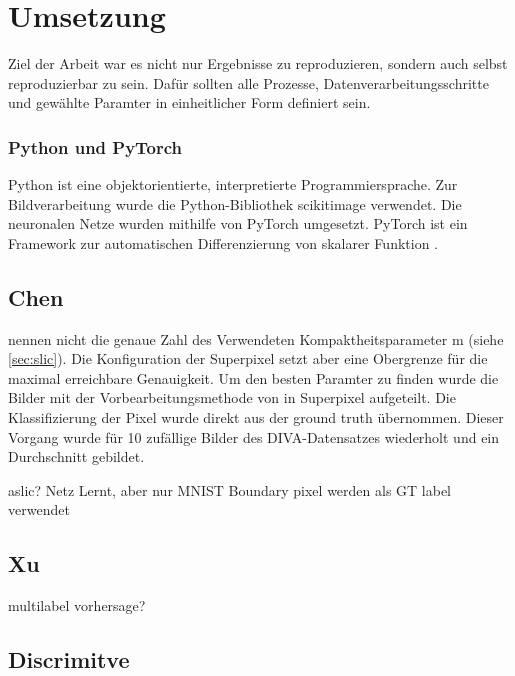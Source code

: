\chapter{Umsetzung}
Ziel der Arbeit war es nicht nur Ergebnisse zu reproduzieren, sondern auch selbst reproduzierbar zu sein. 
Dafür sollten alle Prozesse, Datenverarbeitungsschritte und gewählte Paramter in einheitlicher Form definiert sein.  
\subsection{Python und PyTorch}
Python ist eine objektorientierte, interpretierte Programmiersprache.
Zur Bildverarbeitung wurde die Python-Bibliothek scikitimage verwendet.
Die neuronalen Netze wurden mithilfe von PyTorch umgesetzt.
PyTorch ist ein Framework zur automatischen Differenzierung von skalarer Funktion \autocite{PaszkeAutomaticdifferentiationPyTorch2017}.
\label{chap:umsetzung}
\section{Chen}
\citeauthor{ChenConvolutionalNeuralNetworks2017a} nennen nicht die genaue Zahl des Verwendeten Kompaktheitsparameter m (siehe \cref{sec:slic}). 
Die Konfiguration der Superpixel setzt aber eine Obergrenze für die maximal erreichbare Genauigkeit.
Um den besten Paramter zu finden wurde die Bilder mit der Vorbearbeitungsmethode von \citeauthor{ChenConvolutionalNeuralNetworks2017a} in Superpixel aufgeteilt. 
Die Klassifizierung der Pixel wurde direkt aus der ground truth übernommen.
Dieser Vorgang wurde für 10 zufällige Bilder des DIVA-Datensatzes wiederholt und ein Durchschnitt gebildet.




aslic?
Netz Lernt, aber nur MNIST
Boundary pixel werden als GT label verwendet

\section{Xu}
multilabel vorhersage?

\section{Discrimitve}

